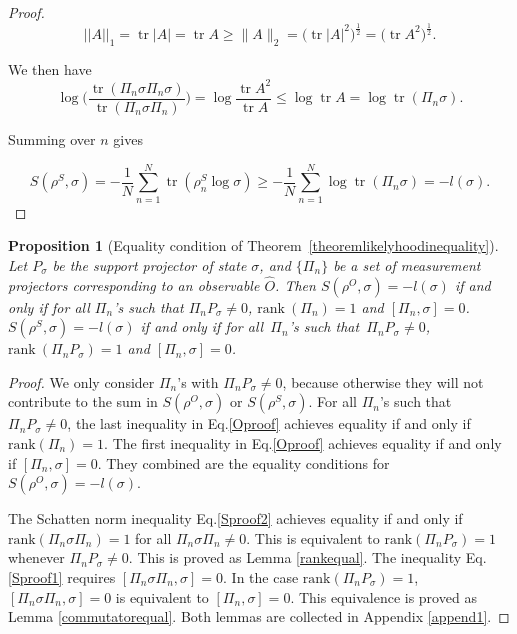 \documentclass[11pt]{article}
\newtheorem{proposition}{Proposition}
\theoremstyle{definition}
\DeclareMathOperator{\tr}{\text{tr}}
\begin{document}
\begin{proof}
\begin{equation}
    ||A||_1 = \tr |A| = \tr A \geq  \|A\|_2 = \big( 
    \tr|A|^2 \big)^\frac{1}{2} = \big( 
    \tr A^2 \big)^\frac{1}{2} .
\end{equation}

We then have
\begin{equation}\label{Sproof2}
    \log \Bigg( 
    \frac{\tr(\Pi_n \sigma \Pi_n \sigma)}{\tr(\Pi_n \sigma \Pi_n)} \Bigg)
    = \log \frac{\tr A^2}{\tr A} \leq \log \tr A 
    = \log \tr (\Pi_n \sigma).
\end{equation}

Summing over $n$ gives 

\begin{equation}
    S(\rho^S, \sigma) = - \frac{1}{N}\sum_{n = 1}^N
    \tr(\rho_n^S \log \sigma) \geq -\frac{1}{N} \sum_{n = 1}^N \log \tr(\Pi_n \sigma) = -l(\sigma).
\end{equation}


\end{proof}


\begin{proposition}[Equality condition of Theorem~\ref{theoremlikelyhoodinequality}]\label{theoremequalityremark} Let $P_{\sigma}$ 
 be the support projector of state $\sigma$, and $\{\Pi_n\}$ be a set of measurement projectors corresponding to an observable $\hat O$. Then
$S(\rho^O, \sigma)=-l(\sigma)$ if and only if for all $\Pi_n$'s such that $\Pi_n  P_{\sigma}\neq 0$, $\text{rank}~(\Pi_n) = 1$ and $[\Pi_n,\sigma]=0$. $S(\rho^S, \sigma)=-l(\sigma)$ if and only if for all~$\Pi_n$'s such that~$\Pi_n  P_{\sigma}\neq 0$, $\text{rank}~(\Pi_n P_{\sigma}) = 1$ and $[\Pi_n,\sigma]=0$.
\end{proposition}

\begin{proof}
We only consider $\Pi_n$'s with $\Pi_n  P_{\sigma}\neq 0$, because otherwise they will not contribute to the sum in $S(\rho^O,\sigma)$ or $S(\rho^S,\sigma)$.
For all $\Pi_n$'s such that $\Pi_n  P_{\sigma}\neq 0$, the last inequality in Eq.\eqref{Oproof} achieves equality if and only if $\text{rank}(\Pi_n) = 1$. The first inequality in Eq.\eqref{Oproof} achieves equality if and only if $[\Pi_n,\sigma]=0$. They combined are the equality conditions for $S(\rho^O, \sigma)=-l(\sigma)$.

The Schatten norm inequality Eq.\eqref{Sproof2}  achieves equality if and only if $\text{rank}(\Pi_n \sigma \Pi_n) = 1$ for all $\Pi_n \sigma \Pi_n\neq 0$. This is equivalent to $\text{rank}(\Pi_n P_{\sigma}) = 1$ whenever $\Pi_n P_{\sigma}\neq 0$. This is proved as Lemma \ref{rankequal}. The inequality Eq.\eqref{Sproof1} requires $[\Pi_n \sigma \Pi_n,\sigma]=0$. In the case $\text{rank}(\Pi_n P_{\sigma})=1$, $[\Pi_n \sigma \Pi_n,\sigma]=0$ is equivalent to $[\Pi_n ,\sigma]=0$. This equivalence is proved as Lemma \ref{commutatorequal}. Both lemmas are collected in Appendix \ref{append1}.
\end{proof}
\end{document}
